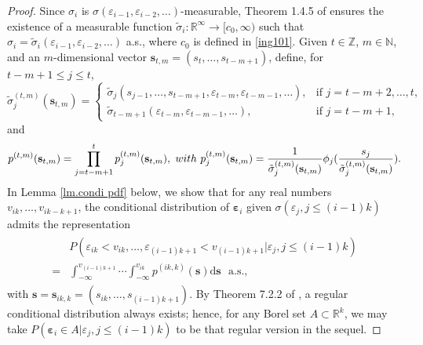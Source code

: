 \documentclass[ejsv2]{imsart}
\theoremstyle{plain}
\theoremstyle{definition}
\theoremstyle{remark}
\begin{document}
\begin{proof}
Since $\sigma_i$
is $\sigma(\varepsilon_{i-1},\varepsilon_{i-2},\ldots)$-measurable,
Theorem 1.4.5 of \cite{Chow1997}
ensures the existence of a measurable function
$\tilde{\sigma}_{i}:\mathbb{R}^\infty\to [c_0, \infty)
$ such that
$\sigma_i=\tilde{\sigma}_{i}(\varepsilon_{i-1},\varepsilon_{i-2},\ldots)$ a.s., where $c_0$ is defined in
\eqref{ing101}.
Given $t\in\mathbb{Z}$, $m\in\mathbb{N}$, and an $m$-dimensional vector $\mathbf{s}_{t,m}=(s_t,\ldots,s_{t-m+1})$, define, for
$t-m+1 \leq j \leq t$,
\begin{equation}\label{tilde sigma def}
\tilde{\sigma}^{(t,m)}_j(\mathbf{s}_{t,m})=
\begin{cases}
  \tilde{\sigma}_{j}(s_{j-1},\ldots,s_{t-m+1},\varepsilon_{t-m},\varepsilon_{t-m-1},\ldots), & \mbox{if } j=t-m+2,\ldots,t, \\
  \tilde{\sigma}_{t-m+1}(\varepsilon_{t-m},\varepsilon_{t-m-1},\ldots), & \mbox{if } j= t-m+1,
\end{cases}
\end{equation}
and
\begin{equation}\label{ing106}
p^{(t,m)}(\mathbf{s}_{t,m})=\prod_{j=t-m+1}^{t}p^{(t,m)}_j(\mathbf{s}_{t,m}),\,\,{\rm with}\,\, 
p^{(t,m)}_j(\mathbf{s}_{t,m})=\frac{1}{\tilde{\sigma}^{(t,m)}_j(\mathbf{s}_{t,m})}\phi_j(\frac{s_{j}}{\tilde{\sigma}^{(t,m)}_j(\mathbf{s}_{t,m})}).
\end{equation}
In Lemma \ref{lm.condi pdf} below, we show that for any real numbers $v_{ik},\ldots,v_{ik-k+1}$, the conditional distribution of $\bm{\varepsilon}_i$ given $\sigma(\varepsilon_j,j\leq (i-1)k)$ admits the  representation
\begin{align}\label{condi dist 3}
\begin{split}
    & P(\varepsilon_{ik}<v_{ik},\ldots,\varepsilon_{(i-1)k+1}<v_{(i-1)k+1} |\varepsilon_j,j\leq (i-1)k)\\ =& \int_{-\infty}^{v_{(i-1)k+1}}\cdots\int_{-\infty}^{v_{ik}}p^{(ik,k)}(\mathbf{s})\mathrm{d}\mathbf{s} \,\,\,\, \textrm{a.s.,}
\end{split}
\end{align}
with $\mathbf{s}=\mathbf{s}_{ik,k}=(s_{ik},\ldots,s_{(i-1)k+1})$.
By Theorem 7.2.2 of \cite{Chow1997},
a regular conditional distribution always exists; hence, for any Borel set 
$A \subset \mathbb{R}^k$,
we may take
$
P(\bm{\varepsilon}_i \in A |\varepsilon_j,j\leq (i-1)k)$
to be that regular version in the sequel.






\end{proof}
\end{document}
